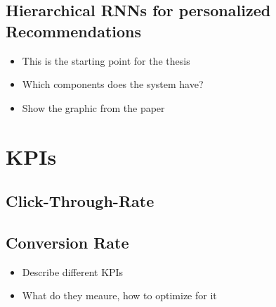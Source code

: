 \subsection{Hierarchical RNNs for personalized Recommendations}
\begin{itemize}
    \item This is the starting point for the thesis
    \item Which components does the system have?
    \item Show the graphic from the paper
\end{itemize}
\cite{hierarchical}

\section{KPIs}
\subsection{Click-Through-Rate}
\subsection{Conversion Rate}
\begin{itemize}
\item Describe different KPIs
\item What do they meaure, how to optimize for it
\end{itemize}
